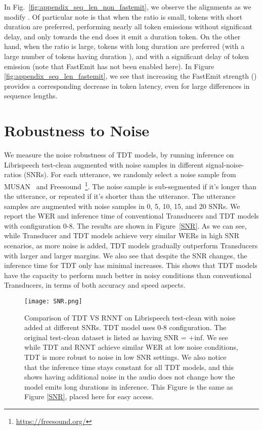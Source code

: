 \documentclass{article}
\begin{document}
In Fig.~\ref{fig:appendix_seq_len_non_fastemit}, we observe the alignments as we modify . Of particular note is that when the ratio  is small, tokens with short duration are preferred, performing nearly all token emissions without significant delay, and only towards the end does it emit a  duration token. On the other hand, when the ratio  is large, tokens with long duration are preferred (with a large number of tokens having duration ), and with a significant delay of token emission (note that FastEmit has not been enabled here). In Figure \ref{fig:appendix_seq_len_fastemit}, we see that increasing the FastEmit strength () provides a corresponding decrease in token latency, even for large differences in sequence lengths.


\section{Robustness to Noise}
We measure the noise robustness of TDT models, by running inference on Librispeech test-clean augmented with noise samples in different signal-noise-ratios (SNRs). For each utterance, we randomly select a noise sample from MUSAN~\cite{snyder2015musan} and Freesound~\footnote{\url{https://freesound.org/}}. 
The noise sample is sub-segmented if it's longer than the utterance, or repeated if it's shorter than the utterance. The utterance samples are augmented with noise samples in 0, 5, 10, 15, and 20 SNRs.
We report the WER and inference time of conventional Transducers and TDT models with configuration 0-8. The results are shown in Figure~\ref{SNR}. As we can see, while Transducer and TDT models achieve very similar WERs in high SNR scenarios, as more noise is added, TDT models gradually outperform Transducers with larger and larger margins.  We also see that despite the SNR changes, the inference time for TDT only has minimal increases. This shows that TDT models have the capacity to perform much better in noisy conditions than conventional Transducers, in terms of both accuracy and speed aspects.





\begin{figure}[t]
    \centering
    \texttt{[image: SNR.png]}
    \caption{Comparison of TDT VS RNNT on Librispeech test-clean with noise added at different SNRs. TDT model uses 0-8 configuration. The original test-clean dataset is listed as having SNR = +inf. We see while TDT and RNNT achieve similar WER at low noise conditions, TDT is more robust to noise in low SNR settings. We also notice that the inference time stays constant for all TDT models, and this shows having additional noise in the audio does not change how the model emits long durations in inference. This Figure is the same as Figure \ref{SNR}, placed here for easy access.}
    \label{SNR2}
\end{figure}
\end{document}
